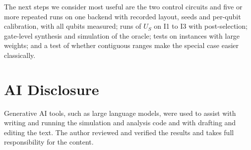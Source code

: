 \documentclass[journal]{IEEEtran}
\begin{document}
The next steps we consider most useful are the two control circuits and five or more repeated runs on one backend with recorded layout, seeds and per-qubit calibration, with all qubits measured; runs of $U_{S}$ on I1 to I3 with post-selection; gate-level synthesis and simulation of the oracle; tests on instances with large weights; and a test of whether contiguous ranges make the special case easier classically.

\section*{AI Disclosure}
Generative AI tools, such as large language models, were used to assist with writing and running the simulation and analysis code and with drafting and editing the text. The author reviewed and verified the results and takes full responsibility for the content.
\end{document}
